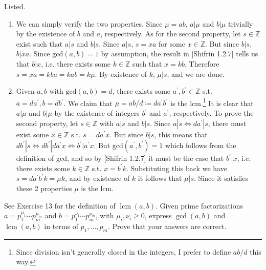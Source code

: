   \begin{solution}
    Listed. 
    \begin{enumerate}
      \item We can simply verify the two properties. Since $\mu = ab$, $a | \mu$ and $b | \mu$ trivially by the existence of $b$ and $a$, respectively. As for the second property, let $s \in \mathbb{Z}$ exist such that $a | s$ and $b | s$. Since $a | s$, $s = xa$ for some $x \in \mathbb{Z}$. But since $b | s$, $b | xa$. Since $\mathrm{gcd}(a, b) = 1$ by assumption, the result in [Shifrin 1.2.7] tells us that $b | x$, i.e. there exists some $k \in \mathbb{Z}$ such that $x = kb$. Therefore $s = xa = kba = kab = k \mu$. By existence of $k$, $\mu | s$, and we are done. 
      \item Given $a, b$ with $\mathrm{gcd}(a, b) = d$, there exists some $a^\prime, b^\prime \in \mathbb{Z}$ s.t. $a = da^\prime, b = db^\prime$. We claim that $\mu = ab/d \coloneqq d a^\prime b^\prime$ is the lcm.\footnote{Since division isn't generally closed in the integers, I prefer to define $ab/d$ this way.} It is clear that $a | \mu$ and $b | \mu$ by the existence of integers $b^\prime$ and $a^\prime$, respectively. To prove the second property, let $s \in \mathbb{Z}$ with $a | s$ and $b | s$. Since $a | s \iff d a^\prime | s$, there must exist some $x \in \mathbb{Z}$ s.t. $s = d a^\prime x$. But since $b | s$, this means that $d b^\prime | s \iff d b^\prime | d a^\prime x \iff b^\prime | a^\prime x$. But $\mathrm{gcd}(a^\prime, b^\prime) = 1$ which follows from the definition of gcd, and so by [Shifrin 1.2.7] it must be the case that $b^\prime | x$, i.e. there exists some $k \in \mathbb{Z}$ s.t. $x = b^\prime k$. Substituting this back we have $s = d a^\prime b^\prime k = \mu k$, and by existence of $k$ it follows that $\mu | s$. Since it satisfies these 2 properties $\mu$ is the lcm. 
    \end{enumerate}
  \end{solution} 

  \begin{exercise}[Shifrin 1.2.14]
    See Exercise 13 for the definition of $\operatorname{lcm}(a, b)$. Given prime factorizations $a = p_1^{\mu_1} \cdots p_m^{\mu_m}$ and $b = p_1^{\nu_1} \cdots p_m^{\nu_m}$, with $\mu_i, \nu_i \geq 0$, express $\gcd(a, b)$ and $\operatorname{lcm}(a, b)$ in terms of $p_1,\ldots,p_m$. Prove that your answers are correct.
  \end{exercise}

